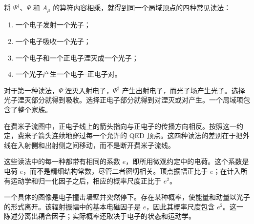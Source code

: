 \begin{classroomqa}
\end{classroomqa}

将 \(\Psi^\dagger\)、\(\Psi\) 和 \(A_\mu\) 的算符内容相乘，就得到同一个局域顶点的四种常见读法：
\begin{enumerate}
\item 一个电子发射一个光子；
\item 一个电子吸收一个光子；
\item 一个电子和一个正电子湮灭成一个光子；
\item 一个光子产生一个电子--正电子对。
\end{enumerate}
对于第一种读法，\(\Psi\) 湮灭入射电子，\(\Psi^\dagger\) 产生出射电子，而光子场产生光子。选择光子湮灭部分就得到吸收。选择正电子部分就得到对湮灭或对产生。一个局域项包含了整个家族。

在费米子流图中，正电子线上的箭头指向与正电子的传播方向相反。按照这一约定，费米子箭头连续地穿过每一个允许的 QED 顶点。这四种读法的差别在于把外线在入射侧和出射侧之间移动，而不是断开费米子流线。

这些读法中的每一种都带有相同的系数 \(e\)，即所用微观约定中的电荷。这个系数是电荷 \(e\)，而不是精细结构常数，尽管二者密切相关。顶点振幅正比于 \(e\)；在计入所有运动学和归一化因子之后，相应的概率尺度正比于 \(e^2\)。

\begin{classroomqa}
\end{classroomqa}

\begin{classroomqa}
\end{classroomqa}

一个具体的图像是电子撞击墙壁并突然停下。存在某种概率，使能量和动量以光子的形式离开。该辐射振幅中的基本电磁因子是 \(e\)，因此其概率尺度包含 \(e^2\)。这一陈述分离出耦合因子；实际概率还取决于电子的状态和运动学。

